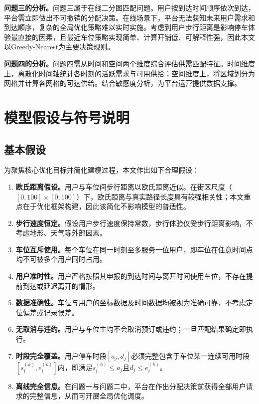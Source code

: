 \documentclass[12pt,a4paper]{ctexart}
\begin{document}
\textbf{问题三的分析。}问题三属于在线二分图匹配问题。用户按到达时间顺序依次到达，平台需立即做出不可撤销的分配决策。在线场景下，平台无法获知未来用户需求和到达顺序，复杂的全局优化策略难以实时实施。考虑到用户步行距离是影响停车体验最直接的因素，且最近车位策略实现简单、计算开销低、可解释性强，因此本文以Greedy-Nearest为主要决策规则。

\textbf{问题四的分析。}问题四需从时间和空间两个维度综合评估供需匹配特征。时间维度上，离散化时间轴统计各时刻的活跃需求与可用供给；空间维度上，将区域划分为网格并计算各网格的可达供给。结合敏感度分析，为平台运营提供数据支撑。


\section{模型假设与符号说明}

\subsection{基本假设}

为聚焦核心优化目标并简化建模过程，本文作出如下合理假设：

\begin{enumerate}
\item \textbf{欧氏距离假设。}用户与车位间步行距离以欧氏距离近似。在街区尺度（$[0,100]\times[0,100]$）下，欧氏距离与真实路径长度具有较强相关性；本文重点在于优化框架构建，因此该简化不影响模型的普适性。
  
\item \textbf{步行速度恒定。}假设用户步行速度保持常数，步行体验仅受步行距离影响，不考虑地形、天气等外部因素。
  
\item \textbf{车位互斥使用。}每个车位在同一时刻至多服务一位用户，即车位在任意时间点均不可被多个用户同时占用。
  
\item \textbf{用户准时性。}用户严格按照其申报的到达时间与离开时间使用车位，不存在提前到达或延迟离开的情形。
  
\item \textbf{数据准确性。}车位与用户的坐标数据及时间数据均被视为准确可靠，不考虑定位偏差或记录误差。
  
\item \textbf{无取消与违约。}用户与车位主均不会取消预订或违约；一旦匹配结果确定即执行。
  
\item \textbf{时段完全覆盖。}用户停车时段$[a_j, d_j]$必须完整包含于车位某一连续可用时段$[s_i^{(k)}, e_i^{(k)}]$内，即满足$s_i^{(k)} \leq a_j$且$d_j \leq e_i^{(k)}$。
  
\item \textbf{离线完全信息。}在问题一与问题二中，平台在作出分配决策前获得全部用户请求的完整信息，从而可开展全局优化调度。
\end{enumerate}
\end{document}
